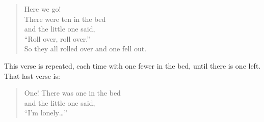 \documentclass[]{book}
\theoremstyle{plain}
\theoremstyle{remark}
\begin{document}
\begin{enumerate}
  \begin{quote}
  Here we go!\\
  There were ten in the bed\\
  and the little one said,\\
  ``Roll over, roll over.''\\
  So they all rolled over and one fell out.
  \end{quote}

  This verse is repeated, each time with one fewer in the bed, until there is one left. That last verse is:

  \begin{quote}
  One!
  There was one in the bed\\
  and the little one said,\\
  ``I'm lonely\ldots{}''
  \end{quote}


\end{enumerate}
\end{document}

